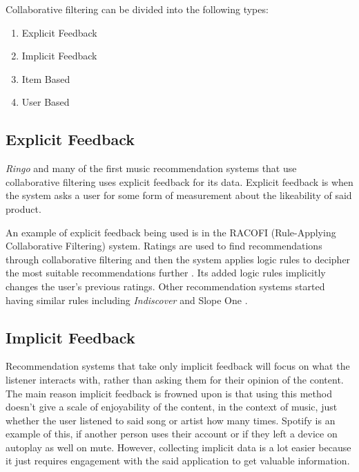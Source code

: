 Collaborative filtering can be divided into the following types:

\begin{enumerate}
	\item Explicit Feedback
	\item Implicit Feedback
	\item Item Based
	\item User Based
\end{enumerate}




\subsection{Explicit Feedback}

\textit{Ringo} and many of the first music recommendation systems that use collaborative filtering uses explicit feedback for its data. Explicit feedback is when the system asks a user for some form of measurement about the likeability of said product. \citep{celma_recommendation_2010}

An example of explicit feedback being used is in the RACOFI (Rule-Applying Collaborative Filtering) system. Ratings are used to find recommendations through collaborative filtering and then the system applies logic rules to decipher the most suitable recommendations further \citep{anderson_racofi_2003}. Its added logic rules implicitly changes the user's previous ratings. Other recommendation systems started having similar rules including \textit{Indiscover} and Slope One \citep{celma_music_2010} \citep{lemire_slope_2007}.

\subsection{Implicit Feedback}

Recommendation systems that take only implicit feedback will focus on what the listener interacts with, rather than asking them for their opinion of the content. The main reason implicit feedback is frowned upon is that using this method doesn't give a scale of enjoyability of the content, in the context of music, just whether the user listened to said song or artist how many times. Spotify is an example of this, if another person uses their account or if they left a device on autoplay as well on mute. However, collecting implicit data is a lot easier because it just requires engagement with the said application to get valuable information. 

